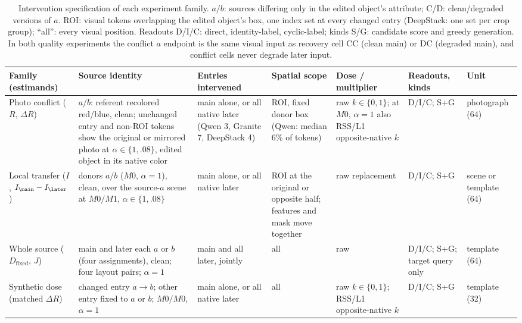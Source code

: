 \begin{table}[tp]
\centering\scriptsize
\setlength{\tabcolsep}{2.5pt}
\renewcommand{\arraystretch}{1.12}
\caption{Intervention specification of each experiment family. $a/b$: sources differing only in the edited object's attribute; C/D: clean/degraded versions of $a$. ROI: visual tokens overlapping the edited object's box, one index set at every changed entry (DeepStack: one set per crop group); ``all'': every visual position. Readouts D/I/C: direct, identity-label, cyclic-label; kinds S/G: candidate score and greedy generation. In both quality experiments the conflict $a$ endpoint is the same visual input as recovery cell CC (clean main) or DC (degraded main), and conflict cells never degrade later input.}
\label{tab:intervention_spec}
\begin{tabularx}{\textwidth}{@{}>{\raggedright\arraybackslash}p{2.0cm}>{\raggedright\arraybackslash}X>{\raggedright\arraybackslash}p{2.0cm}>{\raggedright\arraybackslash}p{2.3cm}>{\raggedright\arraybackslash}p{2.1cm}>{\raggedright\arraybackslash}p{1.6cm}>{\raggedright\arraybackslash}p{1.8cm}@{}}
\toprule
\rowcolor{DSTableHeader}
Family (estimands) & Source identity & Entries intervened & Spatial scope & Dose / multiplier & Readouts, kinds & Unit \\
\midrule
Photo conflict ($R$, $\Delta R$) & $a/b$: referent recolored red/blue, clean; unchanged entry and non-ROI tokens show the original or mirrored photo at $\alpha\in\{1,.08\}$, edited object in its native color & main alone, or all native later (Qwen 3, Granite 7, DeepStack 4) & ROI, fixed donor box (Qwen: median 6\% of tokens) & raw $k\in\{0,1\}$; at $M0$, $\alpha{=}1$ also RSS/L1 opposite-native $k$ & D/I/C; S+G & photograph (64) \\
Local transfer ($I$, $I_{\main}-I_{\later}$) & donors $a/b$ ($M0$, $\alpha{=}1$), clean, over the source-$a$ scene at $M0/M1$, $\alpha\in\{1,.08\}$ & main alone, or all native later & ROI at the original or opposite half; features and mask move together & raw replacement & D/I/C; S+G & scene or template (64) \\
Whole source ($D_{\mathrm{fixed}}$, $J$) & main and later each $a$ or $b$ (four assignments), clean; four layout pairs; $\alpha{=}1$ & main and all later, jointly & all & raw & D/I/C; S+G; target query only & template (64) \\
Synthetic dose (matched $\Delta R$) & changed entry $a\rightarrow b$; other entry fixed to $a$ or $b$; $M0/M0$, $\alpha{=}1$ & main alone, or all native later & all & raw $k\in\{0,1\}$; RSS/L1 opposite-native $k$ & D/I/C; S+G & template (32) \\

\end{tabularx}
\end{table}
